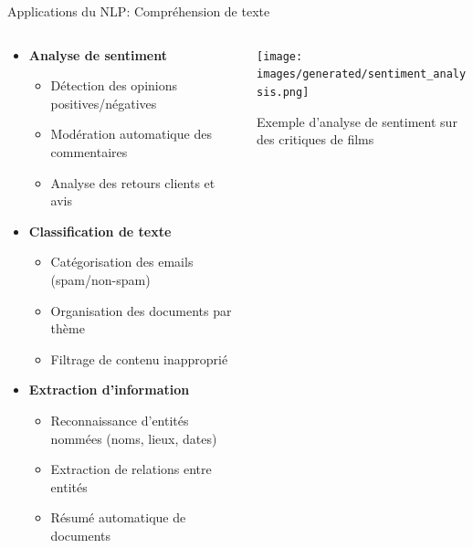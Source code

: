 \documentclass[aspectratio=169,11pt]{beamer}
\begin{document}
\begin{frame}{Applications du NLP: Compréhension de texte}
    \begin{columns}
        \begin{column}{0.55\textwidth}
            \begin{itemize}
                \item \textbf{Analyse de sentiment}
                \begin{itemize}
                    \item Détection des opinions positives/négatives
                    \item Modération automatique des commentaires
                    \item Analyse des retours clients et avis
                \end{itemize}
                \vspace{0.3cm}
                \item \textbf{Classification de texte}
                \begin{itemize}
                    \item Catégorisation des emails (spam/non-spam)
                    \item Organisation des documents par thème
                    \item Filtrage de contenu inapproprié
                \end{itemize}
                \vspace{0.3cm}
                \item \textbf{Extraction d'information}
                \begin{itemize}
                    \item Reconnaissance d'entités nommées (noms, lieux, dates)
                    \item Extraction de relations entre entités
                    \item Résumé automatique de documents
                \end{itemize}
            \end{itemize}
        \end{column}
        \begin{column}{0.45\textwidth}
            \texttt{[image: images/generated/sentiment\_analysis.png]}
            \vspace{0.5cm}
            \begin{center}
                \small{Exemple d'analyse de sentiment sur des critiques de films}
            \end{center}
        \end{column}
    \end{columns}
\end{frame}
\end{document}
